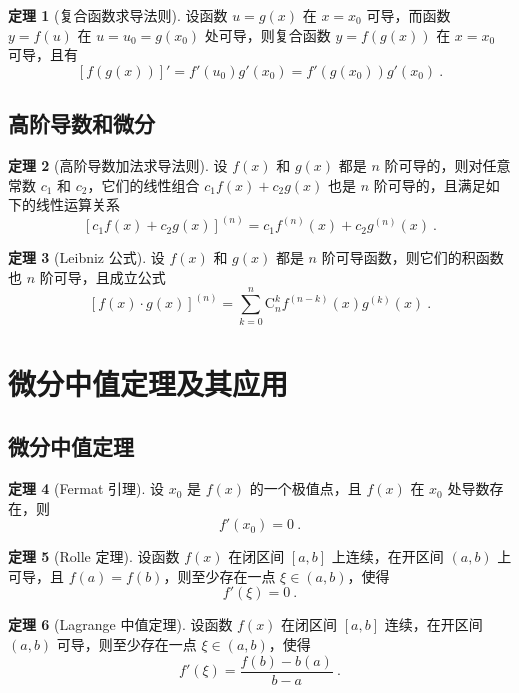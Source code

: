 \documentclass[zihao=-4,linespread=1.8,UTF8,nothm]{aytony_base}
\theoremstyle{definition}
\newtheorem{theorem}{\indent\heiti\textbf{定理}}[subsection]
\begin{document}
\begin{theorem}[复合函数求导法则]
    设函数 $u = g(x)$ 在 $x = x_0$ 可导，而函数 $y = f(u)$ 在 $u = u_0 = g(x_0)$ 处可导，则复合函数 $y = f(g(x))$ 在 $x = x_0$ 可导，且有 $$
        [f(g(x))]' = f'(u_0)g'(x_0) = f'(g(x_0))g'(x_0)\ .
    $$
\end{theorem}

\subsection{高阶导数和微分}

\begin{theorem}[高阶导数加法求导法则]
    设 $f(x)$ 和 $g(x)$ 都是 $n$ 阶可导的，则对任意常数 $c_1$ 和 $c_2$，它们的线性组合 $c_1f(x) + c_2g(x)$ 也是 $n$ 阶可导的，且满足如下的线性运算关系 $$
        [c_1f(x) + c_2g(x)]^{(n)} = c_1f^{(n)}(x) + c_2g^{(n)}(x)\ .
    $$
\end{theorem}

\begin{theorem}[Leibniz 公式]
    设 $f(x) $ 和 $g(x)$ 都是 $n$ 阶可导函数，则它们的积函数也 $n$ 阶可导，且成立公式 $$
        [f(x) \cdot g(x)]^{(n)} = \sum_{k = 0}^{n}\mathrm{C}_n^kf^{(n-k)}(x)g^{(k)}(x)\ .
    $$
\end{theorem}

\section{微分中值定理及其应用}

\subsection{微分中值定理}

\begin{theorem}[Fermat 引理]
    设 $x_0$ 是 $f(x)$ 的一个极值点，且 $f(x)$ 在 $x_0$ 处导数存在，则 $$
        f'(x_0) = 0\ .
    $$
\end{theorem}

\begin{theorem}[Rolle 定理]
    设函数 $f(x)$ 在闭区间 $[a, b]$ 上连续，在开区间 $(a, b)$ 上可导，且 $f(a) = f(b)$，则至少存在一点 $\xi \in (a, b)$，使得 $$
        f'(\xi) = 0\ .
    $$
\end{theorem}

\begin{theorem}[Lagrange 中值定理]
    设函数 $f(x)$ 在闭区间 $[a, b]$ 连续，在开区间 $(a, b)$ 可导，则至少存在一点 $\xi \in (a, b)$，使得 $$
        f'(\xi) = \dfrac{f(b) - b(a)}{b - a}\ .
    $$
\end{theorem}
\end{document}
